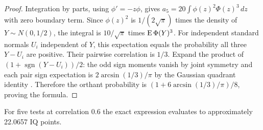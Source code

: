 \begin{proof}
Integration by parts, using $\phi'=-z\phi$, gives
$a_5=20\int \phi(z)^2\Phi(z)^3\,dz$ with zero boundary term.
Since $\phi(z)^2$ is $1/(2\sqrt\pi)$ times the density of
$Y\sim N(0,1/2)$, the integral is $10/\sqrt\pi$ times
$\operatorname{E}\Phi(Y)^3$. For independent standard normals $U_i$ independent of $Y$,
this expectation equals the probability all three $Y-U_i$ are positive.
Their pairwise correlation is $1/3$. Expand the product of
$(1+\operatorname{sgn}(Y-U_i))/2$: the odd sign moments vanish by joint
symmetry and each pair sign expectation is $2\arcsin(1/3)/\pi$ by
the Gaussian quadrant identity \citep{tong}. Therefore the orthant
probability is $(1+6\arcsin(1/3)/\pi)/8$, proving the formula.
\end{proof}
For five tests at correlation 0.6 the exact expression evaluates to
approximately 22.0657 IQ points.
